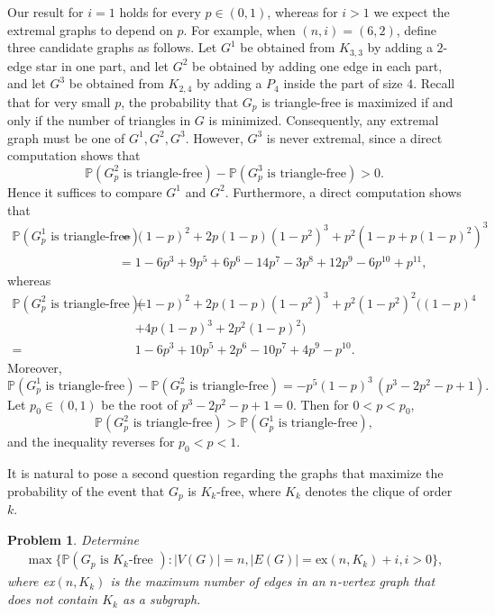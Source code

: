 \documentclass[11pt,a4paper]{article}
\newcommand{\bP}{\mathbb{P}}
\newtheorem{problem}{Problem}
\begin{document}
Our result for $i=1$ holds for every $p\in(0,1)$, whereas for $i>1$ we expect the extremal graphs to depend on $p$.
For example, when $(n,i)=(6,2)$, define three candidate graphs as follows. Let $G^1$ be obtained from $K_{3,3}$ by adding a $2$-edge star in one part, and let $G^2$ be obtained by adding one edge in each part, and let $G^3$ be obtained from $K_{2,4}$ by adding a $P_4$ inside the part of size $4$. Recall that for very small $p$, the probability that $G_p$ is triangle-free is maximized if and only if
the number of triangles in $G$ is minimized. Consequently, any extremal graph must be one of
$G^1,G^2,G^3$. However, $G^3$ is never extremal, since a direct computation shows that
\[
\mathbb{P}(G^2_{p}\text{ is triangle-free})
-\mathbb{P}(G^3_{p}\text{ is triangle-free})
>0.
\]
Hence it suffices to compare $G^1$ and $G^2$. Furthermore, a direct computation shows that
\begin{align*}
\mathbb{P}(G_{p}^1 \text{ is triangle-free})
&= (1-p)^2+2p(1-p)(1-p^2)^3+p^2(1-p+p(1-p)^2)^3\\
&=1-6p^3+9p^5+6p^6-14p^7-3p^8+12p^9-6p^{10}+p^{11},
\end{align*}
whereas
\begin{align*}
\mathbb{P}(G_{p}^2\text{ is triangle-free})
=&(1-p)^2+2p(1-p)(1-p^2)^3+p^2 (1-p^2)^2\bigl((1-p)^4\\
&+4p(1-p)^3+2p^2(1-p)^2\bigr)\\
=&1-6p^3+10p^5+2p^6-10p^7+4p^9-p^{10}.
\end{align*}
Moreover,
\[
\mathbb{P}(G_{p}^1\text{ is triangle-free})
-\mathbb{P}(G_{p}^2\text{ is triangle-free})
=-p^5(1-p)^3\,(p^3-2p^2-p+1).
\]
Let $p_0\in(0,1)$ be the  root of $p^3-2p^2-p+1=0$. 
Then for $0<p<p_0$,
\[
\bP \left(G^2_p \text{ is triangle-free}\right) > \bP \left(G^1_p \text{ is triangle-free}\right),
\]
 and the inequality reverses for $p_0<p<1$.

It is natural to pose a second question regarding the graphs that maximize the probability of the event that $G_p$ is $K_k$-free, where $K_k$ denotes the clique of order $k$. 	
\begin{problem}\label{prob:2}
    Determine 
    \begin{align*}
    \max\{\mathbb{P}(G_p \text{ is $K_k$-free } ): |V(G)|=n, |E(G)|=\mathrm{ex}(n, K_k) + i, i>0\},
    \end{align*}
    where ex$(n, K_k)$ is the maximum number of edges in an $n$-vertex graph that does not contain $K_k$ as a subgraph.
        \end{problem}
\end{document}
